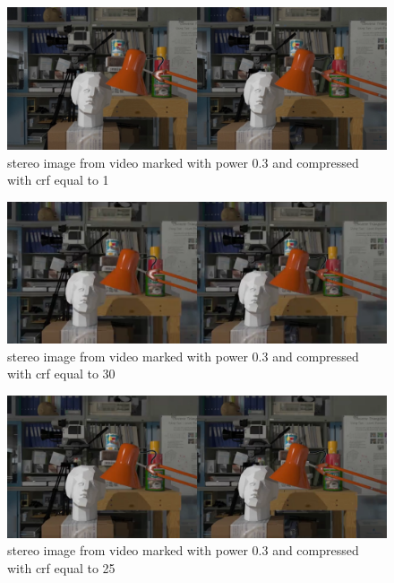 \begin{figure}[h!]
\centering
\includegraphics[width=1\textwidth]{./img/03_crf1_gt.png}
\caption{\small{stereo image from video marked with power 0.3 and compressed with crf equal to 1 }}
\label{fig:03crf1}
\end{figure}
\begin{figure}[h!]
\centering
\includegraphics[width=1\textwidth]{./img/03_crf30_gt.png}
\caption{\small{stereo image from video marked with power 0.3 and compressed with crf equal to 30 }}
\label{fig:03crf30}
\end{figure}
\begin{figure}[h!]
\centering
\includegraphics[width=1\textwidth]{./img/03_crf25_gt.png}
\caption{\small{stereo image from video marked with power 0.3 and compressed with crf equal to 25 }}
\label{fig:03crf25}
\end{figure}

